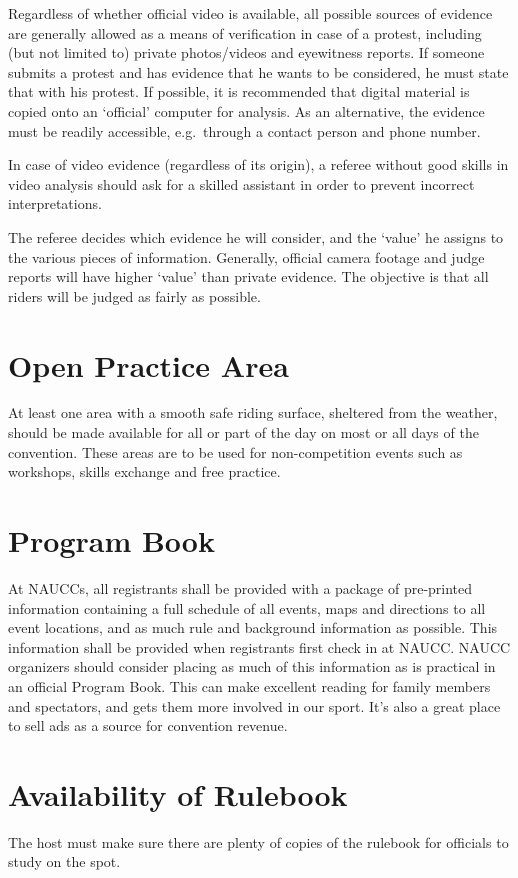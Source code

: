 Regardless of whether official video is available, all possible sources of evidence are generally allowed as a means of verification in case of a protest, including (but not limited to) private photos/videos and eyewitness reports.
If someone submits a protest and has evidence that he wants to be considered, he must state that with his protest.
If possible, it is recommended that digital material is copied onto an `official' computer for analysis.
As an alternative, the evidence must be readily accessible, e.g.\ through a contact person and phone number.

In case of video evidence (regardless of its origin), a referee without good skills in video analysis should ask for a skilled assistant in order to prevent incorrect interpretations.

The referee decides which evidence he will consider, and the `value' he assigns to the various pieces of information.
Generally, official camera footage and judge reports will have higher `value' than private evidence.
The objective is that all riders will be judged as fairly as possible.

\section{Open Practice Area}
At least one area with a smooth safe riding surface, sheltered from the weather, should be made available for all or part of the day on most or all days of the convention.
These areas are to be used for non-competition events such as workshops, skills exchange and free practice.

\section{Program Book}

At NAUCCs, all registrants shall be provided with a package of pre-printed information containing a full schedule of all events, maps and directions to all event locations, and as much rule and background information as possible.
This information shall be provided when registrants first check in at NAUCC.
NAUCC organizers should consider placing as much of this information as is practical in an official Program Book.
This can make excellent reading for family members and spectators, and gets them more involved in our sport.
It's also a great place to sell ads as a source for convention revenue.

\section{Availability of Rulebook}
The host must make sure there are plenty of copies of the rulebook for officials to study on the spot.


